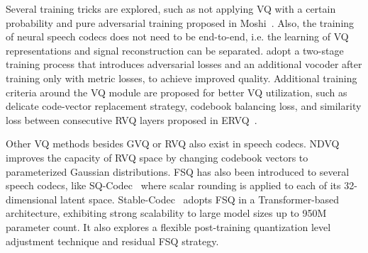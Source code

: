 
Several training tricks are explored, such as not applying VQ with a certain probability and pure adversarial training proposed in Moshi~\cite{kyutai2024moshi}.
Also, the training of neural speech codecs does not need to be end-to-end, i.e. the learning of VQ representations and signal reconstruction can be separated.
\cite{audiodec,du2024apcodec+} adopt a two-stage training process that introduces adversarial losses and an additional vocoder after training only with metric losses, to achieve improved quality.
Additional training criteria around the VQ module are proposed for better VQ utilization, such as delicate code-vector replacement strategy, codebook balancing loss, and similarity loss between consecutive RVQ layers proposed in ERVQ~\cite{zheng2024ervq}.



Other VQ methods besides GVQ or RVQ also exist in speech codecs.
NDVQ~\cite{niu2024ndvq} improves the capacity of RVQ space by changing codebook {vectors} to parameterized Gaussian {distributions}.
FSQ has also been introduced to several speech codecs, like SQ-Codec~\cite{yang24l_interspeech} where scalar rounding is applied to each of its 32-dimensional latent space.
Stable-Codec~\cite{parker2024scalingtransformerslowbitratehighquality} adopts FSQ in a Transformer-based architecture, exhibiting strong scalability to large model sizes up to 950M parameter count.
It also explores a flexible post-training quantization level adjustment technique and residual FSQ strategy.

